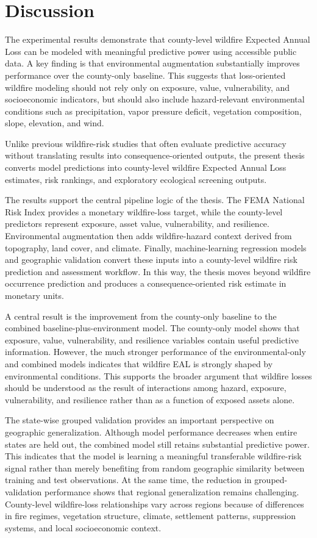 \chapter{Discussion}
\label{chap:discussion}

The experimental results demonstrate that county-level wildfire Expected Annual Loss can be modeled with meaningful predictive power using accessible public data. A key finding is that environmental augmentation substantially improves performance over the county-only baseline. This suggests that loss-oriented wildfire modeling should not rely only on exposure, value, vulnerability, and socioeconomic indicators, but should also include hazard-relevant environmental conditions such as precipitation, vapor pressure deficit, vegetation composition, slope, elevation, and wind.

Unlike previous wildfire-risk studies that often evaluate predictive accuracy without translating results into consequence-oriented outputs, the present thesis converts model predictions into county-level wildfire Expected Annual Loss estimates, risk rankings, and exploratory ecological screening outputs.

The results support the central pipeline logic of the thesis. The FEMA National Risk Index provides a monetary wildfire-loss target, while the county-level predictors represent exposure, asset value, vulnerability, and resilience. Environmental augmentation then adds wildfire-hazard context derived from topography, land cover, and climate. Finally, machine-learning regression models and geographic validation convert these inputs into a county-level wildfire risk prediction and assessment workflow. In this way, the thesis moves beyond wildfire occurrence prediction and produces a consequence-oriented risk estimate in monetary units.

A central result is the improvement from the county-only baseline to the combined baseline-plus-environment model. The county-only model shows that exposure, value, vulnerability, and resilience variables contain useful predictive information. However, the much stronger performance of the environmental-only and combined models indicates that wildfire EAL is strongly shaped by environmental conditions. This supports the broader argument that wildfire losses should be understood as the result of interactions among hazard, exposure, vulnerability, and resilience rather than as a function of exposed assets alone.

The state-wise grouped validation provides an important perspective on geographic generalization. Although model performance decreases when entire states are held out, the combined model still retains substantial predictive power. This indicates that the model is learning a meaningful transferable wildfire-risk signal rather than merely benefiting from random geographic similarity between training and test observations. At the same time, the reduction in grouped-validation performance shows that regional generalization remains challenging. County-level wildfire-loss relationships vary across regions because of differences in fire regimes, vegetation structure, climate, settlement patterns, suppression systems, and local socioeconomic context.

